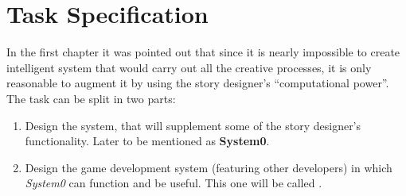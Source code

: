 \section{Task Specification}
In the first chapter it was pointed out that since it is nearly impossible to create intelligent system that would carry out all the creative processes, it is only reasonable to augment it by using the story designer's ``computational power''.
The task can be split in two parts:
\begin{enumerate}
\item Design the system, that will supplement some of the story designer's functionality. Later to be mentioned as \textbf{System0}.
\item Design the game development system (featuring other developers) in which \textit{System0} can function and be useful. This one will be called .
\end{enumerate}
